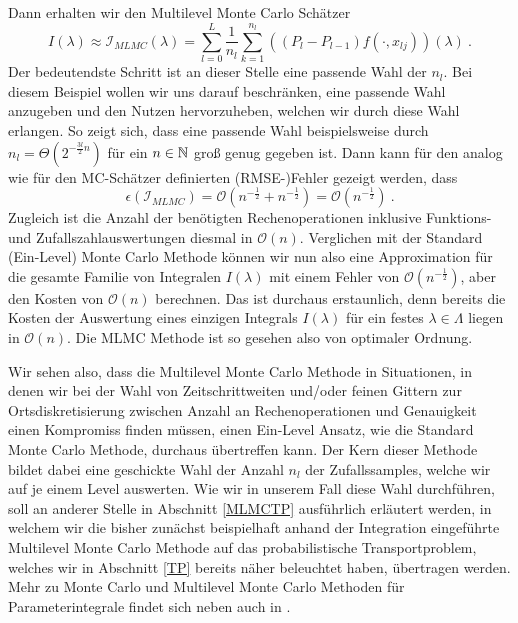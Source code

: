 \begin{Beispiel}
	  Dann erhalten wir den Multilevel Monte Carlo Schätzer 
	  \[
	   I(\lambda) \approx \mathcal{I}_{MLMC}(\lambda) = \sum_{l=0}^{L} \frac{1}{n_l} \sum_{k=1}^{n_l} ((P_l - P_{l-1}) f(\cdot,x_{lj}))(\lambda) \ .
	  \]
	  Der bedeutendste Schritt ist an dieser Stelle eine passende Wahl der $ n_l $. Bei diesem Beispiel wollen wir uns darauf beschränken, eine passende Wahl anzugeben und den Nutzen hervorzuheben, welchen wir durch diese Wahl erlangen. So zeigt sich, dass eine passende Wahl beispielsweise durch $ n_l = \Theta(2^{-\frac{3l}{2}n})$ für ein $ n \in \mathbb{N} $ groß genug gegeben ist. 
	  Dann kann für den analog wie für den MC-Schätzer definierten (RMSE-)Fehler gezeigt werden, dass 
	  \[
	  	\epsilon(\mathcal{I}_{MLMC}) = \mathcal{O}(n^{-\frac{1}{2}} + n^{-\frac{1}{2}}) = \mathcal{O}(n^{-\frac{1}{2}}) \ .
	  \]
	  Zugleich ist die Anzahl der benötigten Rechenoperationen inklusive Funktions- und Zufallszahlauswertungen diesmal in $ \mathcal{O}(n) $.
	  Verglichen mit der Standard (Ein-Level) Monte Carlo Methode können wir nun also eine Approximation für die gesamte Familie von Integralen $ I(\lambda) $ mit einem Fehler von $ \mathcal{O}(n^{-\frac{1}{2}}) $, aber den Kosten von $ \mathcal{O}(n) $  berechnen. Das ist durchaus erstaunlich, denn bereits die Kosten der Auswertung eines einzigen Integrals $ I(\lambda) $ für ein festes $ \lambda \in \Lambda $ liegen in $ \mathcal{O}(n) $. Die MLMC Methode ist so gesehen also von optimaler Ordnung.
\end{Beispiel}

Wir sehen also, dass die Multilevel Monte Carlo Methode in Situationen, in denen wir bei der Wahl von Zeitschrittweiten und/oder feinen Gittern zur Ortsdiskretisierung zwischen Anzahl an Rechenoperationen und Genauigkeit einen Kompromiss finden müssen, einen Ein-Level Ansatz, wie die Standard Monte Carlo Methode, durchaus übertreffen kann.
Der Kern dieser Methode bildet dabei eine geschickte Wahl der Anzahl $ n_l $ der Zufallssamples, welche wir auf je einem Level auswerten. Wie wir in unserem Fall diese Wahl durchführen, soll an anderer Stelle in Abschnitt \ref{MLMCTP} ausführlich erläutert werden, in welchem wir die bisher zunächst beispielhaft anhand der Integration eingeführte Multilevel Monte Carlo Methode auf das probabilistische Transportproblem, welches wir in Abschnitt \ref{TP} bereits näher beleuchtet haben, übertragen werden.
Mehr zu Monte Carlo und Multilevel Monte Carlo Methoden für Parameterintegrale findet sich neben \cite{heinrich2001multilevel} auch in \cite{heinrich1992random}.


